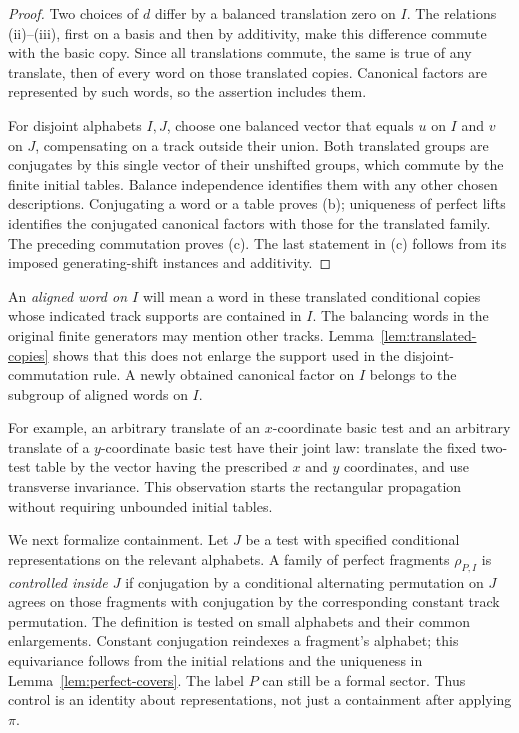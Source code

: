 \begin{proof}
Two choices of $d$ differ by a balanced translation zero on $I$.
The relations (ii)--(iii), first on a basis and then by additivity,
make this difference commute with the basic copy.  Since all
translations commute, the same is true of any translate, then
of every word on those translated copies.  Canonical factors
are represented by such words, so the assertion includes them.

For disjoint alphabets $I,J$, choose one balanced vector that
equals $u$ on $I$ and $v$ on $J$, compensating on a track
outside their union.  Both translated groups are conjugates
by this single vector of their unshifted groups, which commute
by the finite initial tables.  Balance independence identifies
them with any other chosen descriptions.  Conjugating a word
or a table proves (b); uniqueness of perfect lifts identifies
the conjugated canonical factors with those for the translated
family.  The preceding commutation proves (c).
The last statement in (c) follows from its imposed
generating-shift instances and additivity.
\end{proof}

An \emph{aligned word on $I$} will mean a word in these translated
conditional copies whose indicated track supports are contained
in $I$.  The balancing words in the original finite generators
may mention other tracks.  Lemma~\ref{lem:translated-copies}
shows that this does not enlarge the support used in the
disjoint-commutation rule.  A newly obtained canonical factor
on $I$ belongs to the subgroup of aligned words on $I$.

For example, an arbitrary translate of an $x$-coordinate basic
test and an arbitrary translate of a $y$-coordinate basic test
have their joint law: translate the fixed two-test table by the
vector having the prescribed $x$ and $y$ coordinates, and use
transverse invariance.  This observation starts the rectangular
propagation without requiring unbounded initial tables.

We next formalize containment.  Let $J$ be a test with specified
conditional representations on the relevant alphabets.
A family of perfect fragments
$\rho_{P,I}$ is \emph{controlled inside $J$} if conjugation by
a conditional alternating permutation on $J$ agrees on those
fragments with conjugation by the corresponding constant track
permutation.  The definition is tested on small alphabets and
their common enlargements.  Constant conjugation reindexes a
fragment's alphabet; this equivariance follows from the initial
relations and the uniqueness in Lemma~\ref{lem:perfect-covers}.
The label $P$ can still be a formal sector.  Thus control is an
identity about representations, not just a containment after
applying $\pi$.

